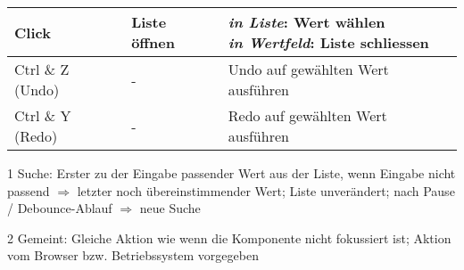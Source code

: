 \begin{table}[ht!]
\begin{threeparttable}
\begin{tabular}{ l || l | l }
            \hline
            Click      & Liste öffnen     & \tbbr{\textit{in Liste}: Wert wählen \\
                                                  \textit{in Wertfeld}: Liste schliessen} \\
            \hline \hline
            Ctrl \& Z (Undo)    & -       & Undo auf gewählten Wert ausführen         \\
            \hline
            Ctrl \& Y (Redo)    & -       & Redo auf gewählten Wert ausführen         \\
            \hline
        \end{tabular}
        \begin{tablenotes}
            \scriptsize
            \item[1] Suche: Erster zu der Eingabe passender Wert aus der Liste, wenn Eingabe nicht passend $\Rightarrow$ letzter noch übereinstimmender Wert; 
                            Liste unverändert; nach Pause / Debounce-Ablauf $\Rightarrow$ neue Suche
            \item[2] Gemeint: Gleiche Aktion wie wenn die Komponente nicht fokussiert ist; Aktion vom Browser bzw. Betriebssystem vorgegeben
        \end{tablenotes}
    \end{threeparttable}
\end{table}
